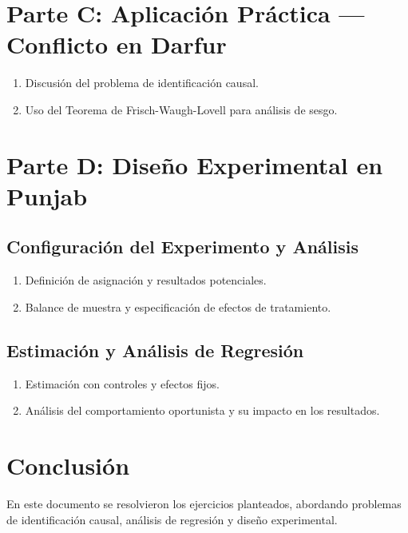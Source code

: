 \documentclass[12pt, letter]{article}
\begin{document}

\section{Parte C: Aplicación Práctica — Conflicto en Darfur}
\begin{enumerate}[label=C.\arabic*]
    \item Discusión del problema de identificación causal.
    \item Uso del Teorema de Frisch-Waugh-Lovell para análisis de sesgo.
\end{enumerate}




\section{Parte D: Diseño Experimental en Punjab}
\subsection{Configuración del Experimento y Análisis}
\begin{enumerate}[label=D.\arabic*]
    \item Definición de asignación y resultados potenciales.
    \item Balance de muestra y especificación de efectos de tratamiento.
\end{enumerate}

\subsection{Estimación y Análisis de Regresión}
\begin{enumerate}[label=D.\arabic*]
    \item Estimación con controles y efectos fijos.
    \item Análisis del comportamiento oportunista y su impacto en los resultados.
\end{enumerate}

\section*{Conclusión}
\noindent En este documento se resolvieron los ejercicios planteados, abordando problemas de identificación causal, análisis de regresión y diseño experimental.
\end{document}
